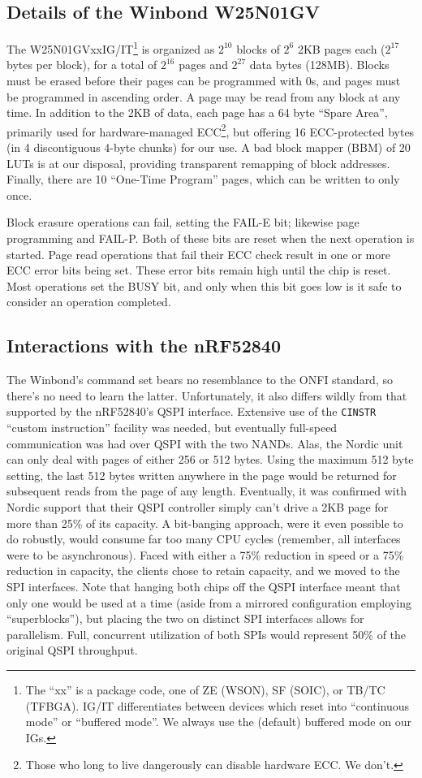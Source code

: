 \documentclass[letterpaper,10pt]{article}
\begin{document}
\subsection{Details of the Winbond W25N01GV}
The W25N01GVxxIG/IT\footnote{The ``xx'' is a package code, one of ZE (WSON), SF (SOIC),
or TB/TC (TFBGA). IG/IT differentiates between devices which reset into ``continuous mode''
or ``buffered mode''. We always use the (default) buffered mode on our IGs.} is
organized as $2^{10}$ blocks of $2^6$ 2KB pages each ($2^{17}$ bytes per block), for
a total of $2^{16}$ pages and $2^{27}$ data bytes (128MB). Blocks must be
erased before their pages can be programmed with 0s, and pages must be
programmed in ascending order. A page may be read from any block at any time.
In addition to the 2KB of data, each page has a 64 byte ``Spare Area'',
primarily used for hardware-managed ECC\footnote{Those who long to live
dangerously can disable hardware ECC. We don't.}, but offering 16 ECC-protected bytes
(in 4 discontiguous 4-byte chunks) for our use. A bad block mapper (BBM) of 20
LUTs is at our disposal, providing transparent remapping of block addresses.
Finally, there are 10 ``One-Time Program'' pages, which can be written to only
once.

Block erasure operations can fail, setting the FAIL-E bit; likewise page
programming and FAIL-P. Both of these bits are reset when the next operation
is started. Page read operations that fail their ECC check result in one or
more ECC error bits being set. These error bits remain high until the chip is
reset. Most operations set the BUSY bit, and only when this bit goes low is it
safe to consider an operation completed.

\subsection{Interactions with the nRF52840}
The Winbond's command set bears no resemblance to the ONFI
standard\parencite{onfi}, so there's no need to learn the latter. Unfortunately,
it also differs wildly from that supported by the nRF52840's QSPI
interface. Extensive use of the {\texttt{CINSTR}} ``custom instruction''
facility was needed, but eventually full-speed communication was had over
QSPI with the two NANDs. Alas, the Nordic unit can only deal with pages of
either 256 or 512 bytes. Using the maximum 512 byte setting, the last 512 bytes
written anywhere in the page would be returned for subsequent reads from the
page of any length. Eventually, it was confirmed with Nordic support that their
QSPI controller simply can't drive a 2KB page for more than 25\% of its
capacity. A bit-banging approach, were it even possible to do robustly,
would consume far too many CPU cycles (remember, all interfaces were to be
asynchronous). Faced with either a 75\% reduction in speed or a 75\% reduction
in capacity, the clients chose to retain capacity, and we moved to the SPI interfaces.
Note that hanging both chips off the QSPI interface meant that only one would
be used at a time (aside from a mirrored configuration employing
``superblocks''\parencite{superblocks}), but placing the two on distinct SPI
interfaces allows for parallelism. Full, concurrent utilization of both SPIs would represent
50\% of the original QSPI throughput.
\end{document}
